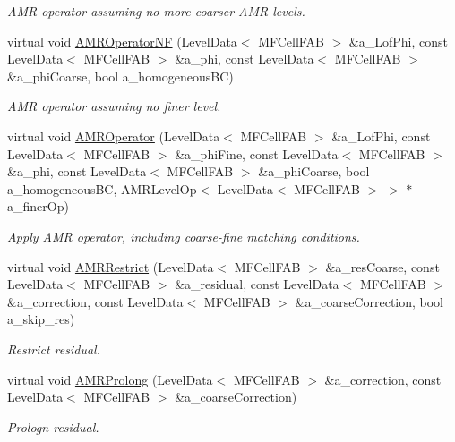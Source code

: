 \begin{DoxyCompactItemize}
\begin{DoxyCompactList}\small\item\em A\+MR operator assuming no more coarser A\+MR levels. \end{DoxyCompactList}\item 
virtual void \hyperlink{classnwomfconductivityop_a0000d49efcbc3205f53f839d8443b78e}{A\+M\+R\+Operator\+NF} (Level\+Data$<$ M\+F\+Cell\+F\+AB $>$ \&a\+\_\+\+Lof\+Phi, const Level\+Data$<$ M\+F\+Cell\+F\+AB $>$ \&a\+\_\+phi, const Level\+Data$<$ M\+F\+Cell\+F\+AB $>$ \&a\+\_\+phi\+Coarse, bool a\+\_\+homogeneous\+BC)
\begin{DoxyCompactList}\small\item\em A\+MR operator assuming no finer level. \end{DoxyCompactList}\item 
virtual void \hyperlink{classnwomfconductivityop_abb2d483bb03f9fb90593db92efc80424}{A\+M\+R\+Operator} (Level\+Data$<$ M\+F\+Cell\+F\+AB $>$ \&a\+\_\+\+Lof\+Phi, const Level\+Data$<$ M\+F\+Cell\+F\+AB $>$ \&a\+\_\+phi\+Fine, const Level\+Data$<$ M\+F\+Cell\+F\+AB $>$ \&a\+\_\+phi, const Level\+Data$<$ M\+F\+Cell\+F\+AB $>$ \&a\+\_\+phi\+Coarse, bool a\+\_\+homogeneous\+BC, A\+M\+R\+Level\+Op$<$ Level\+Data$<$ M\+F\+Cell\+F\+AB $>$ $>$ $\ast$a\+\_\+finer\+Op)
\begin{DoxyCompactList}\small\item\em Apply A\+MR operator, including coarse-\/fine matching conditions. \end{DoxyCompactList}\item 
virtual void \hyperlink{classnwomfconductivityop_a8d7211891c8b78056e2f6a508f71280b}{A\+M\+R\+Restrict} (Level\+Data$<$ M\+F\+Cell\+F\+AB $>$ \&a\+\_\+res\+Coarse, const Level\+Data$<$ M\+F\+Cell\+F\+AB $>$ \&a\+\_\+residual, const Level\+Data$<$ M\+F\+Cell\+F\+AB $>$ \&a\+\_\+correction, const Level\+Data$<$ M\+F\+Cell\+F\+AB $>$ \&a\+\_\+coarse\+Correction, bool a\+\_\+skip\+\_\+res)
\begin{DoxyCompactList}\small\item\em Restrict residual. \end{DoxyCompactList}\item 
virtual void \hyperlink{classnwomfconductivityop_ae4fbaa61ea23396223a196612bac0d76}{A\+M\+R\+Prolong} (Level\+Data$<$ M\+F\+Cell\+F\+AB $>$ \&a\+\_\+correction, const Level\+Data$<$ M\+F\+Cell\+F\+AB $>$ \&a\+\_\+coarse\+Correction)
\begin{DoxyCompactList}\small\item\em Prologn residual. \end{DoxyCompactList}\item 

\end{DoxyCompactItemize}
